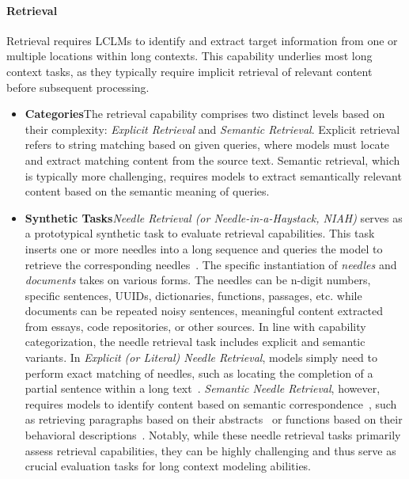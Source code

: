\documentclass[11pt, a4paper, logo, copyright, nonumbering]{map}
\begin{document}
\paragraph{Retrieval} Retrieval requires LCLMs to identify and extract target information from one or multiple locations within long contexts. This capability underlies most long context tasks, as they typically require implicit retrieval of relevant content before subsequent processing. 
\begin{itemize}
    \item \textbf{Categories}\quad The retrieval capability comprises two distinct levels based on their complexity: \textit{Explicit Retrieval} and \textit{Semantic Retrieval}. Explicit retrieval refers to string matching based on given queries, where models must locate and extract matching content from the source text. Semantic retrieval, which is typically more challenging, requires models to extract semantically relevant content based on the semantic meaning of queries.
    \item \textbf{Synthetic Tasks}\quad \textit{Needle Retrieval (or Needle-in-a-Haystack, NIAH)} serves as a prototypical synthetic task to evaluate retrieval capabilities. This task inserts one or more needles into a long sequence and queries the model to retrieve the corresponding needles~\citep{mohtashami2023landmark,needleinhaystack,hsieh2024ruler,li2024needlebench,xiong2024artificial,zhu-etal-2024-longembed,li2023long,liu2024repoqa,bai2023longbench,roberts2024needle}. The specific instantiation of \textit{needles} and \textit{documents} takes on various forms. The needles can be n-digit numbers, specific sentences, UUIDs, dictionaries, functions, passages, etc. while documents can be repeated noisy sentences, meaningful content extracted from essays, code repositories, or other sources. In line with capability categorization, the needle retrieval task includes explicit and semantic variants. In \textit{Explicit (or Literal) Needle Retrieval}, models simply need to perform exact matching of needles, such as locating the completion of a partial sentence within a long text~\citep{mohtashami2023landmark,needleinhaystack,hsieh2024ruler,li2024needlebench,li2023long}. \textit{Semantic Needle Retrieval}, however, requires models to identify content based on semantic correspondence~\citep{modarressi2025nolima}, such as retrieving paragraphs based on their abstracts~\citep{bai2023longbench,zhu-etal-2024-longembed} or functions based on their behavioral descriptions~\citep{liu2024repoqa}. Notably, while these needle retrieval tasks primarily assess retrieval capabilities, they can be highly challenging and thus serve as crucial evaluation tasks for long context modeling abilities.

\end{itemize}
\end{document}
